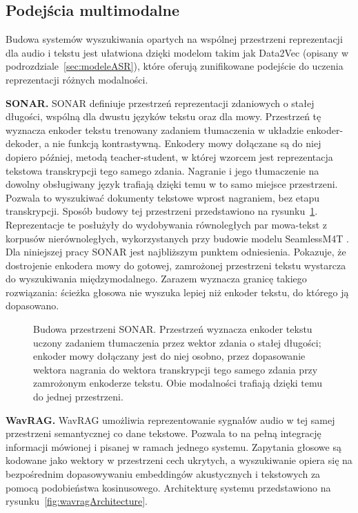 \subsection{Podejścia multimodalne}
\label{sec:multimodalne}

Budowa systemów wyszukiwania opartych na wspólnej przestrzeni reprezentacji dla audio i tekstu jest ułatwiona dzięki modelom takim jak Data2Vec (opisany w podrozdziale~\ref{sec:modeleASR}), które oferują zunifikowane podejście do uczenia reprezentacji różnych modalności.

\textbf{SONAR.} SONAR \cite{sonar} definiuje przestrzeń reprezentacji zdaniowych o stałej długości, wspólną dla dwustu języków tekstu oraz dla mowy. Przestrzeń tę wyznacza enkoder tekstu trenowany zadaniem tłumaczenia w układzie enkoder-dekoder, a nie funkcją kontrastywną. Enkodery mowy dołączane są do niej dopiero później, metodą teacher-student, w której wzorcem jest reprezentacja tekstowa transkrypcji tego samego zdania. Nagranie i jego tłumaczenie na dowolny obsługiwany język trafiają dzięki temu w to samo miejsce przestrzeni. Pozwala to wyszukiwać dokumenty tekstowe wprost nagraniem, bez etapu transkrypcji. Sposób budowy tej przestrzeni przedstawiono na rysunku~\ref{fig:sonarArchitecture}. Reprezentacje te posłużyły do wydobywania równoległych par mowa-tekst z korpusów nierównoległych, wykorzystanych przy budowie modelu SeamlessM4T \cite{m4t}. Dla niniejszej pracy SONAR jest najbliższym punktem odniesienia. Pokazuje, że dostrojenie enkodera mowy do gotowej, zamrożonej przestrzeni tekstu wystarcza do wyszukiwania międzymodalnego. Zarazem wyznacza granicę takiego rozwiązania: ścieżka głosowa nie wyszuka lepiej niż enkoder tekstu, do którego ją dopasowano.

\begin{figure}[htbp]
    \centering
    \caption{Budowa przestrzeni SONAR. Przestrzeń wyznacza enkoder tekstu uczony zadaniem
    tłumaczenia przez wektor zdania o stałej długości; enkoder mowy dołączany jest do niej
    osobno, przez dopasowanie wektora nagrania do wektora transkrypcji tego samego zdania przy
    zamrożonym enkoderze tekstu. Obie modalności trafiają dzięki temu do jednej przestrzeni.}
    \label{fig:sonarArchitecture}
\end{figure}

\textbf{WavRAG.} WavRAG \cite{wavRAG} umożliwia reprezentowanie sygnałów audio w tej samej przestrzeni semantycznej co dane tekstowe. Pozwala to na pełną integrację informacji mówionej i pisanej w ramach jednego systemu. Zapytania głosowe są kodowane jako wektory w przestrzeni cech ukrytych, a wyszukiwanie opiera się na bezpośrednim dopasowywaniu embeddingów akustycznych i tekstowych za pomocą podobieństwa kosinusowego. Architekturę systemu przedstawiono na rysunku~\ref{fig:wavragArchitecture}.

